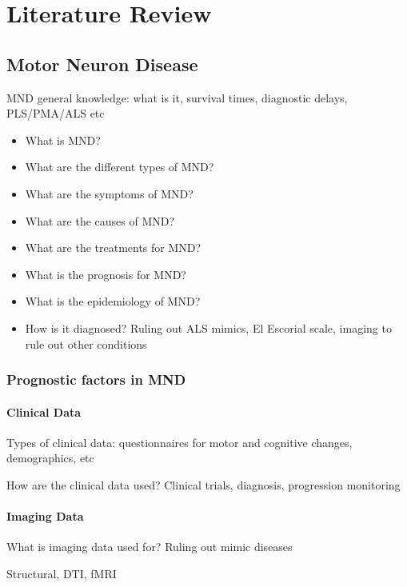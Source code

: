 \chapter{Literature Review}
\label{literature_review}

\section{Motor Neuron Disease}

MND general knowledge: what is it, survival times, diagnostic delays, PLS/PMA/ALS etc

\begin{itemize}
    \item What is MND?
    \item What are the different types of MND?
    \item What are the symptoms of MND?
    \item What are the causes of MND?
    \item What are the treatments for MND?
    \item What is the prognosis for MND?
    \item What is the epidemiology of MND?
    \item How is it diagnosed? Ruling out ALS mimics, El Escorial scale, imaging to rule out other conditions
\end{itemize}

\subsection{Prognostic factors in MND}

\subsubsection{Clinical Data}

Types of clinical data: questionnaires for motor and cognitive changes, demographics, etc

How are the clinical data used? Clinical trials, diagnosis, progression monitoring

\subsubsection{Imaging Data}

What is imaging data used for? Ruling out mimic diseases


Structural, DTI, fMRI


